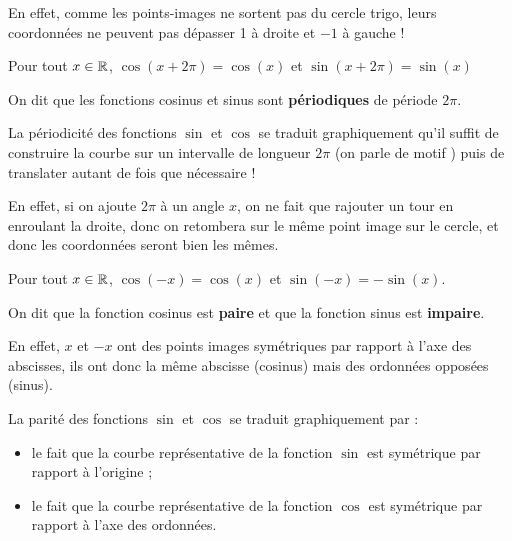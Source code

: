 \documentclass[a4paper,11pt]{article}
\begin{document}
\begin{cdemoblanc}
En effet, comme les points-images ne sortent pas du cercle trigo, leurs coordonnées ne peuvent pas dépasser 1 à droite et $-1$ à gauche !
\end{cdemoblanc}

\begin{cprop}[ : périodicité]
Pour tout $x \in \R$, $\cos(x+2\pi)=\cos(x)$ et $\sin(x+2\pi)= \sin(x) $

On dit que les fonctions cosinus et sinus sont \textbf{périodiques} de période $2\pi$.
\end{cprop}

\begin{crmq}
La périodicité des fonctions {\red $\sin$} et {\blue $\cos$} se traduit graphiquement qu'il suffit de construire la courbe sur un intervalle de longueur $2\pi$ (on parle de \og motif \fg) puis de translater autant de fois que nécessaire !
\end{crmq}

\begin{cdemoblanc}
En effet, si on ajoute $2\pi$ à un angle $x$, on ne fait que rajouter un tour en enroulant la droite, donc on retombera sur le même point image sur le cercle, et donc les  coordonnées seront bien les mêmes.
\end{cdemoblanc}

\begin{cprop}[ : parité]
Pour tout $x \in \R$, $\cos(-x)=\cos(x) $ et $\sin(-x)= -\sin(x) $.

On dit que la fonction cosinus est \textbf{paire} et que la fonction sinus est \textbf{impaire}.
\end{cprop}

\begin{cdemoblanc}
En effet, $x$ et $-x$ ont des points images symétriques par rapport à l'axe des abscisses, ils ont donc la même abscisse (cosinus) mais des ordonnées opposées (sinus).
\end{cdemoblanc}

\begin{crmq}
La parité des fonctions $\sin$ et $\cos$ se traduit graphiquement par :
\begin{itemize}
	\item le fait que la courbe représentative de la fonction {\red $\sin$} est symétrique par rapport à l'origine ;
	\item le fait que la courbe représentative de la fonction {\blue $\cos$} est symétrique par rapport à l'axe des ordonnées.
\end{itemize}
\end{crmq}
\end{document}
